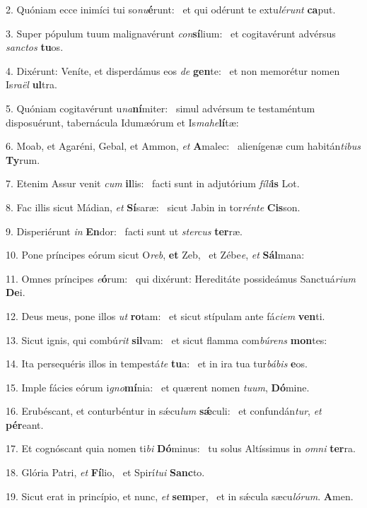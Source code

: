 2. Quóniam ecce inimíci tui so\textit{nu}\textbf{é}runt: \ast\  et qui odérunt te extu\textit{lé}\textit{runt} \textbf{ca}put.\

3. Super pópulum tuum malignavérunt \textit{con}\textbf{sí}lium: \ast\  et cogitavérunt advérsus \textit{sanc}\textit{tos} \textbf{tu}os.\

4. Dixérunt: Veníte, et disperdámus eos \textit{de} \textbf{gen}te: \ast\  et non memorétur nomen Is\textit{ra}\textit{ël} \textbf{ul}tra.\

5. Quóniam cogitavérunt u\textit{na}\textbf{ní}miter: \ast\  simul advérsum te testaméntum disposuérunt, tabernácula Idumæórum et Is\textit{ma}\textit{he}\textbf{lí}tæ:\

6. Moab, et Agaréni, Gebal, et Ammon, \textit{et} \textbf{A}malec: \ast\  alienígenæ cum habitán\textit{ti}\textit{bus} \textbf{Ty}rum.\

7. Etenim Assur venit \textit{cum} \textbf{il}lis: \ast\  facti sunt in adjutórium \textit{fí}\textit{li}\textbf{is} Lot.\

8. Fac illis sicut Mádian, \textit{et} \textbf{Sí}saræ: \ast\  sicut Jabin in tor\textit{rén}\textit{te} \textbf{Cis}son.\

9. Disperiérunt \textit{in} \textbf{En}dor: \ast\  facti sunt ut \textit{ster}\textit{cus} \textbf{ter}ræ.\

10. Pone príncipes eórum sicut O\textit{reb}, \textbf{et} Zeb, \ast\  et Zébe\textit{e}, \textit{et} \textbf{Sál}mana:\

11. Omnes príncipes \textit{e}\textbf{ó}rum: \ast\  qui dixérunt: Hereditáte possideámus Sanctuá\textit{ri}\textit{um} \textbf{De}i.\

12. Deus meus, pone illos \textit{ut} \textbf{ro}tam: \ast\  et sicut stípulam ante fá\textit{ci}\textit{em} \textbf{ven}ti.\

13. Sicut ignis, qui combú\textit{rit} \textbf{sil}vam: \ast\  et sicut flamma com\textit{bú}\textit{rens} \textbf{mon}tes:\

14. Ita persequéris illos in tempestá\textit{te} \textbf{tu}a: \ast\  et in ira tua tur\textit{bá}\textit{bis} \textbf{e}os.\

15. Imple fácies eórum i\textit{gno}\textbf{mí}nia: \ast\  et quærent nomen \textit{tu}\textit{um}, \textbf{Dó}mine.\

16. Erubéscant, et conturbéntur in sǽcu\textit{lum} \textbf{sǽ}culi: \ast\  et confundán\textit{tur}, \textit{et} \textbf{pér}eant.\

17. Et cognóscant quia nomen ti\textit{bi} \textbf{Dó}minus: \ast\  tu solus Altíssimus in \textit{om}\textit{ni} \textbf{ter}ra.\

18. Glória Patri, \textit{et} \textbf{Fí}lio, \ast\  et Spirí\textit{tu}\textit{i} \textbf{Sanc}to.\

19. Sicut erat in princípio, et nunc, \textit{et} \textbf{sem}per, \ast\  et in sǽcula sæcu\textit{ló}\textit{rum}. \textbf{A}men.\

